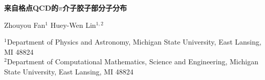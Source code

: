 \documentclass[11pt]{ctexart}
\begin{document}
\begin{center}
  {\LARGE\bfseries 来自格点QCD的$\pi$介子胶子部分子分布\footnotemark[1]\par}
  \vspace{1.2em}
  {\large Zhouyou Fan$^{1}$ \quad Huey-Wen Lin$^{1,2}$\par}
  \vspace{0.9em}
  {\small
   $^{1}$Department of Physics and Astronomy, Michigan State University, East Lansing, MI 48824\\
   $^{2}$Department of Computational Mathematics, Science and Engineering, Michigan State University, East Lansing, MI 48824\par}
\end{center}

\vspace{0.5em}

\begin{abstract}
我们利用赝PDF方法首次由格点QCD确定了$\pi$介子胶子分布的$x$依赖。我们使用 MILC 合作组产生的、具有2+1+1味高度改进 staggered 夸克（HISQ）的格点系综，涵盖两种晶格间距$a\approx 0.12$与0.15~fm、三种$\pi$介子质量$M_\pi\approx 220$、310与690~MeV。价作用采用 clover 费米子，并借助动量涂抹使$\pi$介子提升动量最高达2.29~GeV。我们发现$\pi$介子胶子部分子分布对晶格间距与$\pi$介子质量的依赖较为温和。我们将最轻$\pi$介子质量系综的结果与 JAM 及 xFitter 全局拟合的测定进行了比较。
\end{abstract}






\end{document}
